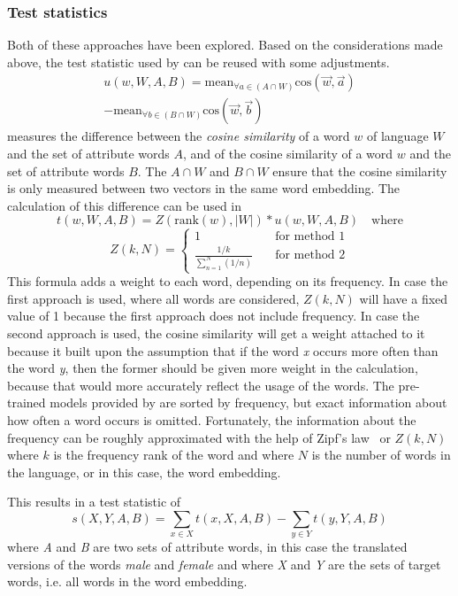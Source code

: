 \subsubsection{Test statistics}
Both of these approaches have been explored. Based on the considerations made above, the
test statistic used by
\textcite{caliskan_2017_semantics_language_corpora} can be reused with some adjustments. 
$$
\begin{aligned}
u(w,W,A,B) = \text{mean}_{\forall a \in (A \cap W)}\text{cos}(\overrightarrow{w}, \overrightarrow{a}) \\
- \text{mean}_{\forall b \in (B \cap W)}\text{cos}(\overrightarrow{w}, \overrightarrow{b})
\end{aligned}
$$
measures the difference between the \textit{cosine similarity} of a word $w$ of language $W$ and the set of attribute words $A$, and of the cosine similarity of a word $w$ and the
set of attribute words $B$. The $A \cap W$ and $B \cap W$ ensure that the cosine
similarity is only measured between two vectors in the same word embedding. The
calculation of this difference can be used in
$$
t(w,W,A,B) = Z(\text{rank}(w), |W|) * u(w,W,A,B)\quad\text{where}
$$
$$
Z(k,N) =
\begin{cases}
    1 & \quad \text{for method 1} \\
    \frac{1/k}{\displaystyle\sum_{n=1}^{N}(1/n)} & \quad \text{for method 2}
\end{cases}
$$
This formula adds a weight to each word, depending on its frequency.
In case the first approach is used, where all words are considered, $Z(k,N)$ will have a
fixed value of 1 because the first approach does not include frequency.
In case the second approach is used, the cosine similarity will get a weight attached
to it because it built upon the assumption that
if the word \textit{x} occurs more often than the word \textit{y}, then the former should
be given more weight in the calculation, because that would more accurately reflect the
usage of the words. The pre-trained models provided by \textcite{grave2018learning} 
are sorted by frequency, but exact information about how often a
word occurs is omitted.
Fortunately, the information about the frequency can be roughly approximated with the
help of Zipf's law~\parencite{Zipf-1935, word_embedding_zipf_context} or $Z(k,N)$ where
$k$ is the frequency rank of the word and where $N$ is the number of words in the language,
or in this case, the word embedding.

This results in a test statistic of
$$
s(X,Y,A,B) = \displaystyle\sum_{x \in X}t(x,X,A,B) - \displaystyle\sum_{y \in Y}t(y,Y,A,B)
$$
where \textit{A} and \textit{B} are two sets of attribute words, in this case the
translated versions of the words \textit{male} and
\textit{female} and where \textit{X} and \textit{Y} are the sets of target words, i.e.
all words in the word embedding.

